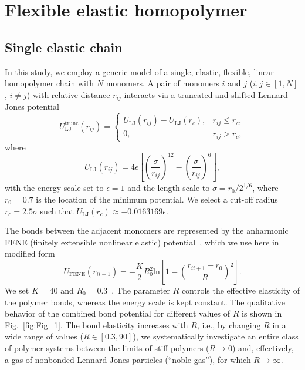 \documentclass[12pt]{report}
\begin{document}
\section{Flexible elastic homopolymer}
\subsection{Single elastic chain}
In this study, we employ a generic model of a single, elastic, flexible,
linear
homopolymer chain with $N$ monomers. A pair of monomers $i$ and $j$
($i,j\in [1,N]$, $i\neq j$) with relative distance $r_{ij}$ interacts
via a
truncated and shifted Lennard-Jones potential
\begin{equation}
U_{\mathrm{LJ}}^{\mathrm{trunc}}(r_{ij}) =  \begin{cases}
U_{\mathrm{LJ}}(r_{ij}) -  U_{\mathrm{LJ}}(r_{c}), &
r_{ij} \leq r_{c},\\
0, &   r_{ij} > r_{c}, \end{cases}
\end{equation}
where
\begin{equation}
U_{\mathrm{LJ}}(r_{ij})= 4\epsilon \left[ \left(
\frac{\sigma}{r_{ij}} \right)^{12} - 			\left(
\frac{\sigma}{r_{ij}} \right)^{6} \right], 
\label{LJ2}
\end{equation}
with the energy scale set to $\epsilon=1$ and the length scale to 
$\sigma=r_0/2^{1/6}$, where $r_0 = 0.7$ is the location of the minimum
potential. We select a cut-off radius $r_c=2.5\sigma$ such that
$U_{\mathrm{LJ}}(r_{c}) \approx -0.0163169\epsilon$.

The bonds between the adjacent monomers are represented by the
anharmonic FENE (finitely extensible nonlinear elastic) 
potential~\cite{BiCuArHa1987,FENE3,MilBhaBin2001}, which we use here in
modified
form
\begin{equation}
U_{\mathrm{FENE}}(r_{ii+1})=-\frac{K}{2}R_{0}^2 
\mathrm{ln}\left[1-\left(\frac{r_{ii+1}-r_0}{R}\right)^2\right]. 
\label{FENE}
\end{equation}
We set $K=40$ and $R_{0}=0.3$~\cite{Gross2013}. 
The parameter $R$ controls the effective elasticity of the polymer bonds,
whereas the energy scale is kept constant. The qualitative behavior of the
combined bond potential for different values of $R$ is shown in
Fig.~\ref{fig:Fig_1}. The bond elasticity increases with $R$,
i.e., by changing $R$ in a wide range of values
($R\in[0.3,90]$), we systematically investigate an
entire class of polymer systems between the limits of stiff polymers
($R\to 0$) and, effectively, a gas of nonbonded Lennard-Jones particles
(``noble gas''), for which $R\to \infty$.  
\end{document}
